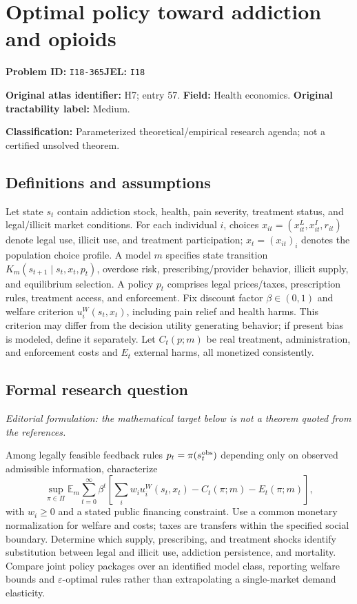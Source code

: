 \documentclass[11pt,a4paper]{article}
\begin{document}
\section*{Optimal policy toward addiction and opioids}
\textbf{Problem ID:} \texttt{I18-365}\quad \textbf{JEL:} \texttt{I18}\par
\label{problem:OP-0057}
\label{atlas:prob:H7}
\noindent\textbf{Original atlas identifier:} H7; entry 57. \textbf{Field:} Health economics. \textbf{Original tractability label:} Medium.

\noindent\textbf{Classification:} Parameterized theoretical/empirical research agenda; not a certified unsolved theorem.

\subsection*{Definitions and assumptions}
Let state $s_t$ contain addiction stock, health, pain severity, treatment status, and legal/illicit market conditions. For each individual $i$, choices $x_{it}=(x_{it}^{L},x_{it}^{I},r_{it})$ denote legal use, illicit use, and treatment participation; $x_t=(x_{it})_i$ denotes the population choice profile. A model $m$ specifies state transition $K_m(s_{t+1}\mid s_t,x_t,p_t)$, overdose risk, prescribing/provider behavior, illicit supply, and equilibrium selection. A policy $p_t$ comprises legal prices/taxes, prescription rules, treatment access, and enforcement. Fix discount factor $\beta\in(0,1)$ and welfare criterion $u_i^{W}(s_t,x_t)$, including pain relief and health harms. This criterion may differ from the decision utility generating behavior; if present bias is modeled, define it separately. Let $C_t(p;m)$ be real treatment, administration, and enforcement costs and $E_t$ external harms, all monetized consistently.

\subsection*{Formal research question}
\emph{Editorial formulation: the mathematical target below is not a theorem quoted from the references.}

Among legally feasible feedback rules $p_t=\pi(s_t^{\rm obs})$ depending only on observed admissible information, characterize
\[
 \sup_{\pi\in\Pi}\mathbb E_m\sum_{t=0}^{\infty}\beta^t
 \left[\sum_iw_i u_i^{W}(s_t,x_t)-C_t(\pi;m)-E_t(\pi;m)\right],
\]
with $w_i\geq0$ and a stated public financing constraint. Use a common monetary normalization for welfare and costs; taxes are transfers within the specified social boundary. Determine which supply, prescribing, and treatment shocks identify substitution between legal and illicit use, addiction persistence, and mortality. Compare joint policy packages over an identified model class, reporting welfare bounds and $\varepsilon$-optimal rules rather than extrapolating a single-market demand elasticity.
\end{document}
